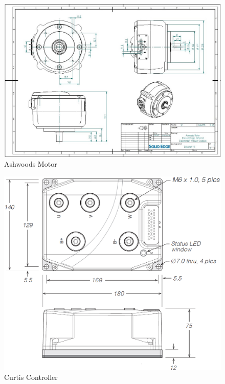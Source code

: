 \begin{figure} [H]
	\begin{center}
		\includegraphics[angle=90, width=\textwidth]{figures/antrieb/Ashwoods_CAD.jpg}
		\caption{Ashwoods Motor}
		\label{Ashwoods_CAD}
	\end{center}
\end{figure}

\begin{figure} [H]
	\begin{center}
		\includegraphics[width=1.05\textwidth]{figures/antrieb/Curtis_CAD.png}
		\caption{Curtis Controller}
		\label{Curtis_CAD}
	\end{center}
\end{figure}

